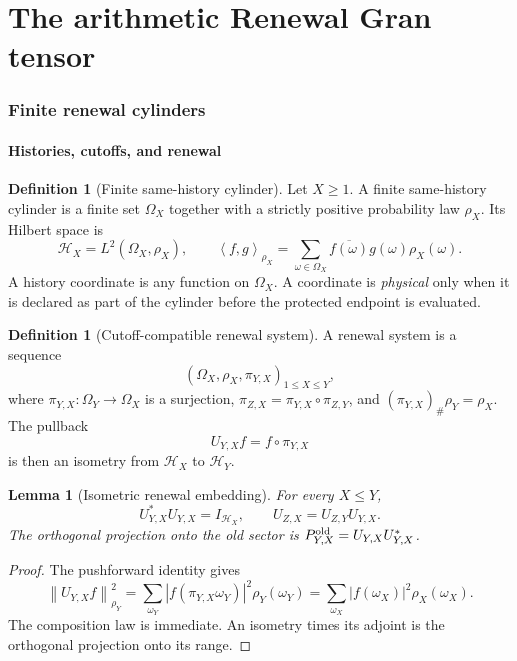 \documentclass[11pt]{article}
\newtheorem{lemma}[theorem]{Lemma}
\theoremstyle{definition}
\newtheorem{definition}[theorem]{Definition}
\theoremstyle{remark}
\newcommand{\norm}[1]{\left\lVert#1\right\rVert}
\newcommand{\ip}[2]{\left\langle#1,#2\right\rangle}
\begin{document}
\part{The arithmetic Renewal Gran tensor}

\section{Finite renewal cylinders}
\label{sec:gran-cylinder}

\subsection{Histories, cutoffs, and renewal}

\begin{definition}[Finite same-history cylinder]
Let $X\ge1$.  A finite same-history cylinder is a finite set $\Omega_X$
together with a strictly positive probability law $\rho_X$.  Its Hilbert space
is
\[
 \mathcal H_X=L^2(\Omega_X,\rho_X),
 \qquad
 \ip{f}{g}_{\rho_X}=\sum_{\omega\in\Omega_X}
 \overline{f(\omega)}g(\omega)\rho_X(\omega).
\]
A history coordinate is any function on $\Omega_X$.  A coordinate is
\emph{physical} only when it is declared as part of the cylinder before the
protected endpoint is evaluated.
\end{definition}

\begin{definition}[Cutoff-compatible renewal system]
A renewal system is a sequence
\[
 (\Omega_X,\rho_X,\pi_{Y,X})_{1\le X\le Y},
\]
where $\pi_{Y,X}:\Omega_Y\to\Omega_X$ is a surjection,
$\pi_{Z,X}=\pi_{Y,X}\circ\pi_{Z,Y}$, and
$(\pi_{Y,X})_\#\rho_Y=\rho_X$.  The pullback
\[
 U_{Y,X}f=f\circ\pi_{Y,X}
\]
is then an isometry from $\mathcal H_X$ to $\mathcal H_Y$.
\end{definition}

\begin{lemma}[Isometric renewal embedding]
\label{lem:renewal-isometry}
For every $X\le Y$,
\[
 U_{Y,X}^*U_{Y,X}=I_{\mathcal H_X},
 \qquad
 U_{Z,X}=U_{Z,Y}U_{Y,X}.
\]
The orthogonal projection onto the old sector is
$P^{\rm old}_{Y,X}=U_{Y,X}U_{Y,X}^*$.
\end{lemma}

\begin{proof}
The pushforward identity gives
\[
 \norm{U_{Y,X}f}_{\rho_Y}^2
 =\sum_{\omega_Y}|f(\pi_{Y,X}\omega_Y)|^2\rho_Y(\omega_Y)
 =\sum_{\omega_X}|f(\omega_X)|^2\rho_X(\omega_X).
\]
The composition law is immediate.  An isometry times its adjoint is the
orthogonal projection onto its range.
\end{proof}
\end{document}
